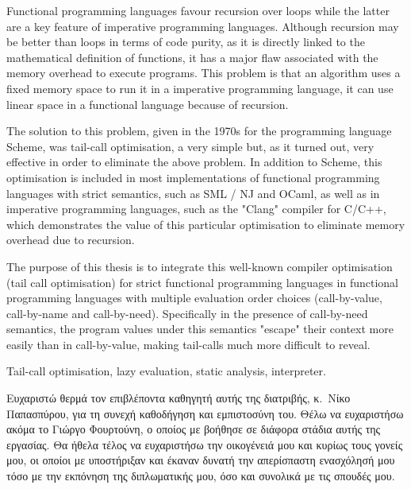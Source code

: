 \documentclass[diploma]{softlab-thesis}
\begin{document}
\begin{abstracten}%
  Functional programming languages favour recursion over loops
  while the latter are a key feature of imperative programming languages. Although recursion may 
  be better than loops in terms of code purity, as it is directly linked to the mathematical definition
  of functions, it has a major flaw associated with the memory overhead to execute
  programs. This problem is that an algorithm uses a fixed memory space to run it
  in a imperative programming language, it can use linear space in a functional language because
  of recursion.
  
  
  The solution to this problem, given in the 1970s for the programming language Scheme, was tail-call 
  optimisation, a very simple but, as it turned out, very effective in order to eliminate the above 
  problem.
  In addition to Scheme, this optimisation is included in most implementations of functional programming 
  languages with strict semantics, such as SML / NJ and OCaml, as well as in imperative programming 
  languages, such as the "Clang" compiler for C/C++, which demonstrates the value of this particular
  optimisation to eliminate memory overhead due to recursion.
  
  The purpose of this thesis is to integrate this well-known compiler optimisation
  (tail call optimisation) for strict functional programming languages in
  functional programming languages with multiple evaluation order choices (call-by-value, call-by-name and
  call-by-need). Specifically in the presence of call-by-need semantics, the program values under this 
  semantics "escape" their context more easily than in call-by-value, making tail-calls much more 
  difficult to reveal.
  

\begin{keywordsen}
Tail-call optimisation, lazy evaluation, static analysis, interpreter. 
\end{keywordsen}
\end{abstracten}



\begin{acknowledgementsgr}
Ευχαριστώ θερμά τον επιβλέποντα καθηγητή αυτής της διατριβής,
κ.~Νίκο Παπασπύρου, για τη συνεχή καθοδήγηση και εμπιστοσύνη
του. Θέλω να ευχαριστήσω ακόμα
το Γιώργο Φουρτούνη, ο οποίος με βοήθησε σε
διάφορα στάδια αυτής της εργασίας.  Θα ήθελα τέλος να ευχαριστήσω
την οικογένειά μου και κυρίως τους γονείς μου, οι οποίοι με
υποστήριξαν και έκαναν δυνατή την απερίσπαστη ενασχόλησή μου τόσο
με την εκπόνηση της διπλωματικής μου, όσο και συνολικά με τις
σπουδές μου.
\end{acknowledgementsgr}
\end{document}
